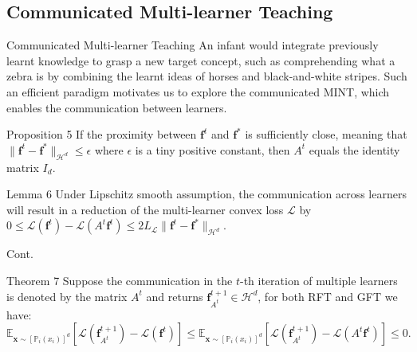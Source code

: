 \documentclass[aspectratio=169,xcolor=dvipsnames]{beamer}
\begin{document}
\subsection{Communicated Multi-learner Teaching}
\begin{frame}{Communicated Multi-learner Teaching}
An infant would \alert{integrate} previously learnt knowledge to grasp a new target concept, such as comprehending  what a zebra is by combining the learnt ideas of horses and black-and-white stripes. Such an efficient paradigm motivates us to explore the \alert{communicated MINT}, which enables the \alert{communication} between learners.
\begin{block}{Proposition 5}
    If the proximity between $\bm{f}^t$ and $\bm{f}^*$ is \alert{sufficiently close}, meaning that $\|\bm{f}^t-\bm{f}^*\|_{\mathcal{H}^d}\leq\epsilon$ where $\epsilon$ is a tiny positive constant, then $A^t$ equals the \alert{identity matrix} $I_d$.
\end{block}

\begin{block}{Lemma 6}
    Under \alert{Lipschitz smooth} assumption, the \alert{communication} across learners will result in a \alert{reduction} of the \alert{multi-learner convex} loss $\mathcal{L}$ by  $0\leq\mathcal{L}(\bm{f}^t)-\mathcal{L}(A^t\bm{f}^t)\leq2L_\mathcal{L}\|\bm{f}^t-\bm{f}^*\|_{\mathcal{H}^d}$.
\end{block}
\end{frame}



\begin{frame}{Cont.}
\begin{block}{Theorem 7}
    Suppose the \alert{communication} in the $t$-th iteration of multiple learners is denoted by the \alert{matrix} $A^t$ and returns $\bm{f}^{t+1}_{A^t}\in\mathcal{H}^d$, for both RFT and GFT we have:
	$$\mathbb{E}_{\bm{x}\sim[\mathbb{P}_i(x_i)]^d}\left[\mathcal{L}(\bm{f}^{t+1}_{A^t})-\mathcal{L}(\bm{f}^t)\right]\leq
		\mathbb{E}_{\bm{x}\sim[\mathbb{P}_i(x_i)]^d}\left[\mathcal{L}(\bm{f}^{t+1}_{A^t})-\mathcal{L}(A^t\bm{f}^t)\right]\leq0.$$
\end{block} 
\end{frame}

\end{document}
